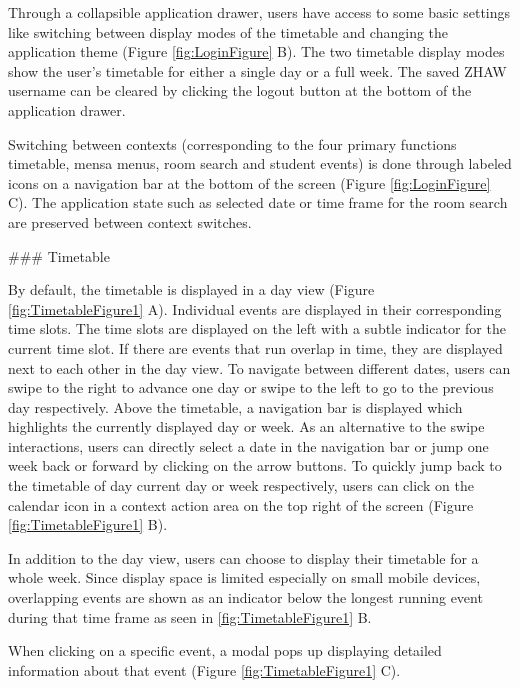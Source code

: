 \begin{markdown}
Through a collapsible application drawer, users have access to some basic settings like switching between display modes of the timetable and changing the application theme (Figure \ref{fig:LoginFigure} B). The two timetable display modes show the user's timetable for either a single day or a full week. The saved ZHAW username can be cleared by clicking the logout button at the bottom of the application drawer.

Switching between contexts (corresponding to the four primary functions timetable, mensa menus, room search and student events) is done through labeled icons on a navigation bar at the bottom of the screen (Figure \ref{fig:LoginFigure} C). The application state such as selected date or time frame for the room search are preserved between context switches.

### Timetable

By default, the timetable is displayed in a day view (Figure \ref{fig:TimetableFigure1} A). Individual events are displayed in their corresponding time slots. The time slots are displayed on the left with a subtle indicator for the current time slot. If there are events that run overlap in time, they are displayed next to each other in the day view. To navigate between different dates, users can swipe to the right to advance one day or swipe to the left to go to the previous day respectively. Above the timetable, a navigation bar is displayed which highlights the currently displayed day or week. As an alternative to the swipe interactions, users can directly select a date in the navigation bar or jump one week back or forward by clicking on the arrow buttons. To quickly jump back to the timetable of day current day or week respectively, users can click on the calendar icon in a context action area on the top right of the screen (Figure \ref{fig:TimetableFigure1} B).

In addition to the day view, users can choose to display their timetable for a whole week. Since display space is limited especially on small mobile devices, overlapping events are shown as an indicator below the longest running event during that time frame as seen in \ref{fig:TimetableFigure1} B.

When clicking on a specific event, a modal pops up displaying detailed information about that event (Figure \ref{fig:TimetableFigure1} C).


\end{markdown}
